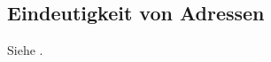 

\subsection{Eindeutigkeit von Adressen}

Siehe \cite{crypto.stackexchange.com/a/2559:rsa-key-collision}.
